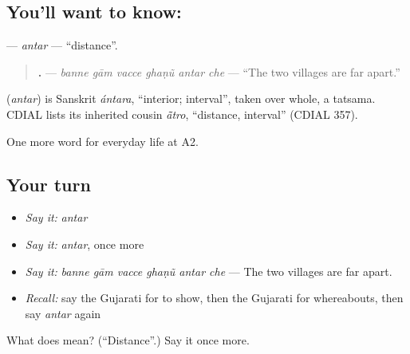 \subsection*{You'll want to know: }
\textbf{} — \emph{antar} — \textquotedblleft{}distance\textquotedblright{}.

\begin{quote}
\textbf{     .} — \emph{banne gām vacce ghaṇũ antar che} — \textquotedblleft{}The two villages are far apart.\textquotedblright{}
\end{quote}

\begin{cousinweb}
\textbf{} (\emph{antar}) is Sanskrit \emph{ántara}, \textquotedblleft{}interior; interval\textquotedblright{}, taken over whole, a tatsama. CDIAL lists its inherited cousin \emph{ā̃tro}, \textquotedblleft{}distance, interval\textquotedblright{} (CDIAL 357).
\end{cousinweb}

\begin{grammarlens}[title={What you've built}]
One more word for everyday life at A2.
\end{grammarlens}

\subsection*{Your turn}
\begin{itemize}
\raggedright
  \item \emph{Say it:} \emph{antar}
  \item \emph{Say it:} \emph{antar}, once more
  \item \emph{Say it:} \emph{banne gām vacce ghaṇũ antar che} — The two villages are far apart.
  \item \emph{Recall:} say the Gujarati for to show, then the Gujarati for whereabouts, then say \emph{antar} again
\end{itemize}

\begin{tcolorbox}[breakable,colback=teal!4,colframe=teal!35!black,title={Before you move on}]
What does  mean? (\textquotedblleft{}Distance\textquotedblright{}.) Say it once more.
\end{tcolorbox}
